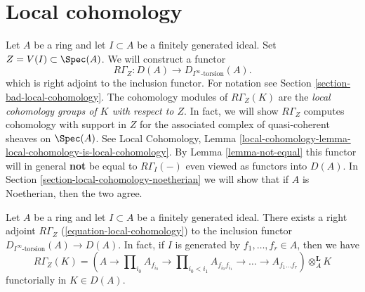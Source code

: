 \section{Local cohomology}
\label{section-local-cohomology}

\noindent
Let $A$ be a ring and let $I \subset A$ be a finitely generated ideal.
Set $Z = V(I) \subset \Spec(A)$. We will construct a functor
\begin{equation}
\label{equation-local-cohomology}
R\Gamma_Z : D(A) \longrightarrow D_{I^\infty\text{-torsion}}(A).
\end{equation}
which is right adjoint to the inclusion functor. For notation
see Section \ref{section-bad-local-cohomology}. The cohomology
modules of $R\Gamma_Z(K)$ are the {\it local cohomology groups
of $K$ with respect to $Z$}. In fact, we will show $R\Gamma_Z$
computes cohomology with support in $Z$ for the associated
complex of quasi-coherent sheaves on $\Spec(A)$. See
Local Cohomology, Lemma
\ref{local-cohomology-lemma-local-cohomology-is-local-cohomology}.
By Lemma \ref{lemma-not-equal} this functor will in general {\bf not} be
equal to $R\Gamma_I( - )$ even viewed as functors into $D(A)$.
In Section \ref{section-local-cohomology-noetherian}
we will show that if $A$ is Noetherian, then the two agree.

\begin{lemma}
\label{lemma-local-cohomology-adjoint}
Let $A$ be a ring and let $I \subset A$ be a finitely generated ideal.
There exists a right adjoint $R\Gamma_Z$ (\ref{equation-local-cohomology})
to the inclusion functor $D_{I^\infty\text{-torsion}}(A) \to D(A)$.
In fact, if $I$ is generated by $f_1, \ldots, f_r \in A$, then we have
$$
R\Gamma_Z(K) =
(A \to \prod\nolimits_{i_0} A_{f_{i_0}} \to
\prod\nolimits_{i_0 < i_1} A_{f_{i_0}f_{i_1}}
\to \ldots \to A_{f_1\ldots f_r}) \otimes_A^\mathbf{L} K
$$
functorially in $K \in D(A)$.
\end{lemma}

